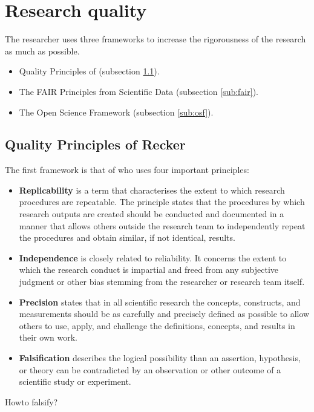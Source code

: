 \section{Research quality}
\label{sec:researchquality}
The researcher uses three frameworks to increase the rigorousness of the research as much as possible.
\begin{itemize}
	\item{Quality Principles of \textcite{Recker2013} (subsection \ref{sub:recker}).}
	\item{The FAIR Principles from Scientific Data (subsection \ref{sub:fair}).}
	\item{The Open Science Framework (subsection \ref{sub:osf}).}
\end{itemize}
\subsection{Quality Principles of Recker}
\label{sub:recker}
The first framework is that of \textcite[p. 16-17]{Recker2013} who uses four important principles:
\begin{itemize}
	\item{\textbf{Replicability} is a term that characterises the extent to which research procedures are repeatable. The principle states that the procedures by which research outputs are created should be conducted and documented in a manner that allows others outside the research team to independently repeat the procedures and obtain similar, if not identical, results.}
	\item{\textbf{Independence} is closely related to reliability. It concerns the extent to which the research conduct is impartial and freed from any subjective judgment or other bias stemming from the researcher or research team itself.}
	\item{\textbf{Precision} states that in all scientific research the concepts, constructs, and measurements should be as carefully and precisely defined as possible to allow others to use, apply, and challenge the definitions, concepts, and results in their own work.}
	\item{\textbf{Falsification} describes the logical possibility than an assertion, hypothesis, or theory can be contradicted by an observation or other outcome of a scientific study or experiment.}
\end{itemize}
\begin{remark}
	Howto falsify? 
\end{remark}
